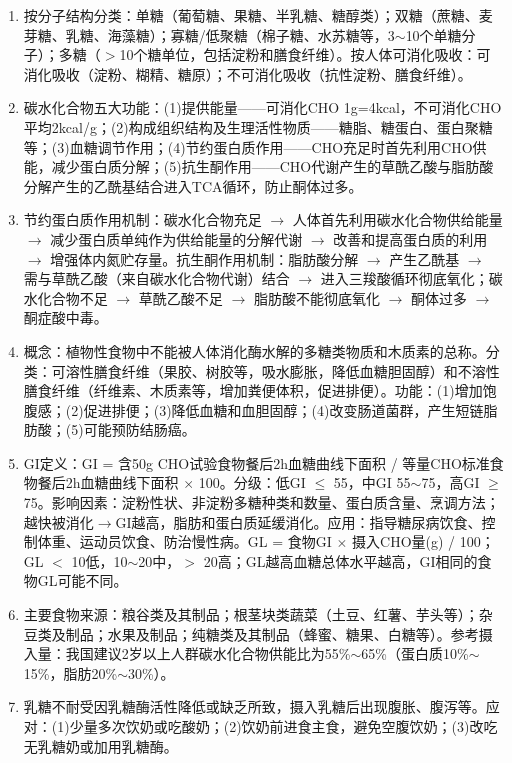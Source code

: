 {\begin{enumerate}[leftmargin=*, itemsep=5pt]
    \item 按分子结构分类：单糖（葡萄糖、果糖、半乳糖、糖醇类）；双糖（蔗糖、麦芽糖、乳糖、海藻糖）；寡糖/低聚糖（棉子糖、水苏糖等，3$\sim$10个单糖分子）；多糖（$>$10个糖单位，包括淀粉和膳食纤维）。按人体可消化吸收：可消化吸收（淀粉、糊精、糖原）；不可消化吸收（抗性淀粉、膳食纤维）。

    \item 碳水化合物五大功能：(1)提供能量——可消化CHO 1g=4kcal，不可消化CHO平均2kcal/g；(2)构成组织结构及生理活性物质——糖脂、糖蛋白、蛋白聚糖等；(3)血糖调节作用；(4)节约蛋白质作用——CHO充足时首先利用CHO供能，减少蛋白质分解；(5)抗生酮作用——CHO代谢产生的草酰乙酸与脂肪酸分解产生的乙酰基结合进入TCA循环，防止酮体过多。

    \item 节约蛋白质作用机制：碳水化合物充足 $\rightarrow$ 人体首先利用碳水化合物供给能量 $\rightarrow$ 减少蛋白质单纯作为供给能量的分解代谢 $\rightarrow$ 改善和提高蛋白质的利用 $\rightarrow$ 增强体内氮贮存量。抗生酮作用机制：脂肪酸分解 $\rightarrow$ 产生乙酰基 $\rightarrow$ 需与草酰乙酸（来自碳水化合物代谢）结合 $\rightarrow$ 进入三羧酸循环彻底氧化；碳水化合物不足 $\rightarrow$ 草酰乙酸不足 $\rightarrow$ 脂肪酸不能彻底氧化 $\rightarrow$ 酮体过多 $\rightarrow$ 酮症酸中毒。

    \item 概念：植物性食物中不能被人体消化酶水解的多糖类物质和木质素的总称。分类：可溶性膳食纤维（果胶、树胶等，吸水膨胀，降低血糖胆固醇）和不溶性膳食纤维（纤维素、木质素等，增加粪便体积，促进排便）。功能：(1)增加饱腹感；(2)促进排便；(3)降低血糖和血胆固醇；(4)改变肠道菌群，产生短链脂肪酸；(5)可能预防结肠癌。

    \item GI定义：GI = 含50g CHO试验食物餐后2h血糖曲线下面积 / 等量CHO标准食物餐后2h血糖曲线下面积 $\times$ 100。分级：低GI $\leq$ 55，中GI 55$\sim$75，高GI $\geq$ 75。影响因素：淀粉性状、非淀粉多糖种类和数量、蛋白质含量、烹调方法；越快被消化$\rightarrow$GI越高，脂肪和蛋白质延缓消化。应用：指导糖尿病饮食、控制体重、运动员饮食、防治慢性病。GL = 食物GI $\times$ 摄入CHO量(g) / 100；GL $<$ 10低，10$\sim$20中，$>$ 20高；GL越高血糖总体水平越高，GI相同的食物GL可能不同。

    \item 主要食物来源：粮谷类及其制品；根茎块类蔬菜（土豆、红薯、芋头等）；杂豆类及制品；水果及制品；纯糖类及其制品（蜂蜜、糖果、白糖等）。参考摄入量：我国建议2岁以上人群碳水化合物供能比为55\%$\sim$65\%（蛋白质10\%$\sim$15\%，脂肪20\%$\sim$30\%）。

    \item 乳糖不耐受因乳糖酶活性降低或缺乏所致，摄入乳糖后出现腹胀、腹泻等。应对：(1)少量多次饮奶或吃酸奶；(2)饮奶前进食主食，避免空腹饮奶；(3)改吃无乳糖奶或加用乳糖酶。
\end{enumerate}
}

\newpage

